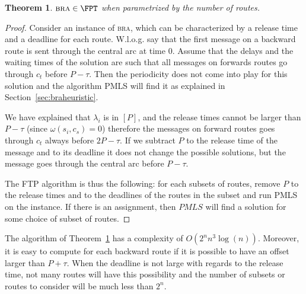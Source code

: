 \documentclass[10pt, conference, letterpaper]{IEEEtran}
\newtheorem{theorem}{Theorem}
\newcommand\bra{\textsc{bra}\xspace}
\begin{document}
\begin{theorem}\label{th:braFPT}
$\bra \in \FPT$ when parametrized by the number of routes.
\end{theorem}
\begin{proof}
 Consider an instance of \bra, which can be characterized by a release time and a deadline for each route.
W.l.o.g. say that the first message on a backward route is sent through the central arc at time $0$. Assume that 
the delays and the waiting times of the solution are such that all messages on forwards routes go through $c_t$ before $P - \tau$. Then the periodicity does not come into play for this solution and the algorithm PMLS will find it as explained in Section~\ref{sec:braheuristic}. 

We have explained that $\lambda_i$ is in $[P]$, and the release times cannot be larger than  
$P-\tau$ (since $\omega(s_i,c_s) = 0$) therefore the messages on forward routes goes through $c_t$ always before $2P - \tau$.
If we subtract $P$ to the release time of the message and to its deadline it does not change the possible solutions, but the message goes through the central arc before $P- \tau$.

The FTP algorithm is thus the following: for each subsets of routes, remove $P$ to the release times and to the deadlines of the routes in the subset and run PMLS on the instance. If there is an assignment, then $PMLS$ will find a solution for some choice 
of subset of routes.
\end{proof}

The algorithm of Theorem~\ref{th:braFPT} has a complexity of $O(2^nn^3\log(n))$. Moreover, it is easy to compute for each backward route if it is possible to have an offset larger than $P + \tau$. When the deadline is not large with regards to  the release time, 
not many routes will have this possibility and the number of subsets or routes to consider will be much less than $2^n$.
\end{document}

